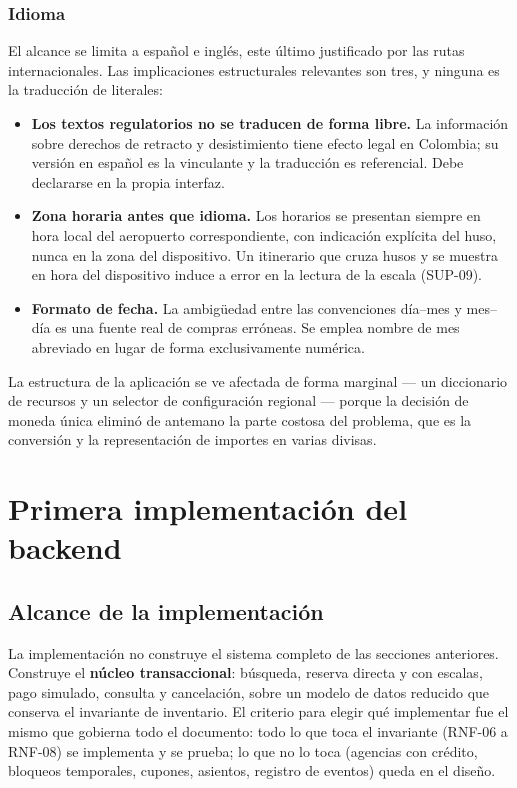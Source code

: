 \documentclass[10pt,letterpaper]{article}
\begin{document}
\subsubsection{Idioma}
El alcance se limita a español e inglés, este último justificado por las rutas internacionales. Las implicaciones estructurales relevantes son tres, y ninguna es la traducción de literales:

\begin{itemize}
  \item \textbf{Los textos regulatorios no se traducen de forma libre.} La información sobre derechos de retracto y desistimiento tiene efecto legal en Colombia; su versión en español es la vinculante y la traducción es referencial. Debe declararse en la propia interfaz.
  \item \textbf{Zona horaria antes que idioma.} Los horarios se presentan siempre en hora local del aeropuerto correspondiente, con indicación explícita del huso, nunca en la zona del dispositivo. Un itinerario que cruza husos y se muestra en hora del dispositivo induce a error en la lectura de la escala (SUP-09).
  \item \textbf{Formato de fecha.} La ambigüedad entre las convenciones día--mes y mes--día es una fuente real de compras erróneas. Se emplea nombre de mes abreviado en lugar de forma exclusivamente numérica.
\end{itemize}

La estructura de la aplicación se ve afectada de forma marginal --- un diccionario de recursos y un selector de configuración regional --- porque la decisión de moneda única eliminó de antemano la parte costosa del problema, que es la conversión y la representación de importes en varias divisas.

\section{Primera implementación del backend}
\label{sec:impl}

\subsection{Alcance de la implementación}
La implementación no construye el sistema completo de las secciones anteriores. Construye el \textbf{núcleo transaccional}: búsqueda, reserva directa y con escalas, pago simulado, consulta y cancelación, sobre un modelo de datos reducido que conserva el invariante de inventario. El criterio para elegir qué implementar fue el mismo que gobierna todo el documento: todo lo que toca el invariante (RNF-06 a RNF-08) se implementa y se prueba; lo que no lo toca (agencias con crédito, bloqueos temporales, cupones, asientos, registro de eventos) queda en el diseño.
\end{document}
